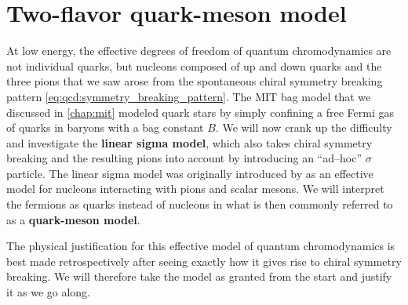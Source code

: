 \chapter{Two-flavor quark-meson model}
\label{chap:lsm2f}


At low energy, the effective degrees of freedom of quantum chromodynamics are not individual quarks,
but nucleons composed of up and down quarks and the three pions that we saw arose from the spontaneous chiral symmetry breaking pattern \eqref{eq:qcd:symmetry_breaking_pattern}.
The MIT bag model that we discussed in \cref{chap:mit} modeled quark stars by simply confining a free Fermi gas of quarks in baryons with a bag constant $B$.
We will now crank up the difficulty and investigate the \textbf{linear sigma model}, which also takes chiral symmetry breaking and the resulting pions into account by introducing an ``ad--hoc'' $\sigma$ particle.
The linear sigma model was originally introduced by \cite{ref:lsm_original} as an effective model for nucleons interacting with pions and scalar mesons.
We will interpret the fermions as quarks instead of nucleons in what is then commonly referred to as a \textbf{quark-meson model}.

The physical justification for this effective model of quantum chromodynamics is best made retrospectively after seeing exactly how it gives rise to chiral symmetry breaking.
We will therefore take the model as granted from the start and justify it as we go along.

